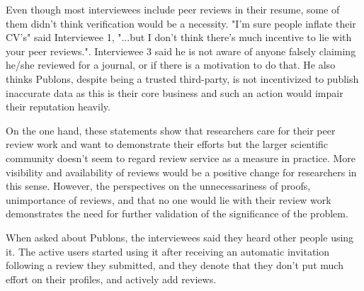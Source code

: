 Even though most interviewees include peer reviews in their resume, some of them didn't think verification would be a necessity. "I'm sure people inflate their CV's" said Interviewee 1, "...but I don't think there's much incentive to lie with your peer reviews.". Interviewee 3 said he is not aware of anyone falsely claiming he/she reviewed for a journal, or if there is a motivation to do that. He also thinks Publons, despite being a trusted third-party, is not incentivized to publish inaccurate data as this is their core business and such an action would impair their reputation heavily. 

On the one hand, these statements show that researchers care for their peer review work and want to demonstrate their efforts but the larger scientific community doesn't seem to regard review service as a measure in practice. More visibility and availability of reviews would be a positive change for researchers in this sense. However, the perspectives on the unnecessariness of proofs, unimportance of reviews, and that no one would lie with their review work demonstrates the need for further validation of the significance of the problem.

When asked about Publons, the interviewees said they heard other people using it. The active users started using it after receiving an automatic invitation following a review they submitted, and they denote that they don't put much effort on their profiles, and actively add reviews. 

